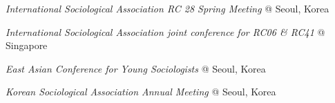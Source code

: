 \begin{aka}
    \item [2018]
    \begin{akb}
        \item \textit{International Sociological Association RC 28 Spring Meeting} @ Seoul, Korea
    \end{akb}

    \item [2018]
    \begin{akb}
        \item \textit{International Sociological Association joint conference for RC06 \& RC41} @ Singapore
    \end{akb}

    \item [2015]
    \begin{akb}
        \item \textit{East Asian Conference for Young Sociologists} @ Seoul, Korea
    \end{akb}

    \item [2014]
    \begin{akb}
        \item \textit{Korean Sociological Association Annual Meeting} @ Seoul, Korea
    \end{akb}


\end{aka}


